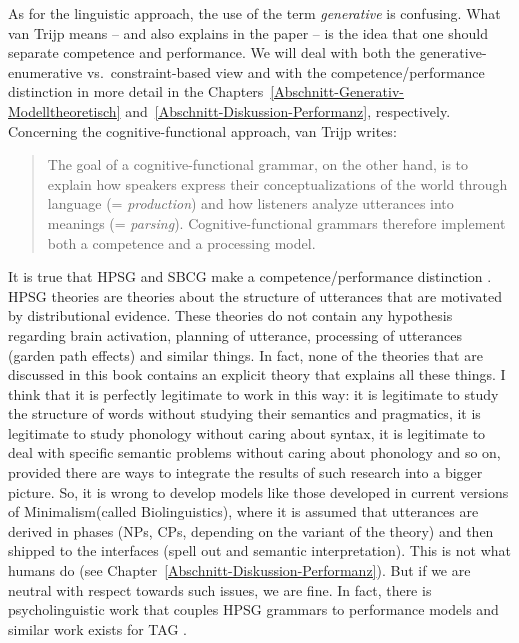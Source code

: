 \label{sec-performance-cxg}

As for the linguistic approach, the use of the term \emph{generative} is
confusing. What van Trijp means -- and also explains in the paper -- is the idea that one should
separate competence and performance. We will deal with both the generative-enumerative
vs.\ constraint-based view and with the competence/performance distinction in more detail in the
Chapters~\ref{Abschnitt-Generativ-Modelltheoretisch} and~\ref{Abschnitt-Diskussion-Performanz},
respectively. Concerning the cognitive-functional approach, van Trijp writes:
\begin{quote}
The goal of a cognitive-functional grammar, on the other hand, is to explain
how speakers express their conceptualizations of the world through language
(= \emph{production}) and how listeners analyze utterances into meanings (= \emph{parsing}).
Cognitive-functional grammars therefore implement both a competence and a
processing model. \citep[]{vanTrijp2013a}
\end{quote}
It is true that HPSG and SBCG make a competence/performance distinction \citep{SW2011a}. HPSG
theories are theories about the structure of utterances that are motivated by distributional
evidence. These theories do not contain any hypothesis regarding brain activation, planning of
utterance, processing of utterances (garden path effects) and similar things. In fact, none of the
theories that are discussed in this book contains an explicit theory that explains all these
things. I think that it is perfectly legitimate to work in this way: it is legitimate to study the
structure of words without studying their semantics and pragmatics, it is legitimate to study
phonology without caring about syntax, it is legitimate to deal with specific semantic problems
without caring about phonology and so on, provided there are ways to integrate the results of such
research into a bigger picture. So, it is wrong to develop models like those developed in current
versions of Minimalism\indexmp (called Biolinguistics), where it is assumed that utterances are derived in
phases (NPs, CPs, depending on the variant of the theory) and then shipped to the interfaces (spell
out and semantic interpretation). This is not what humans do (see
Chapter~\ref{Abschnitt-Diskussion-Performanz}). But if we are neutral with respect towards such
issues, we are fine. In fact, there is psycholinguistic work that couples HPSG grammars to
performance models \citep{Konieczny96a-u} and similar work exists for TAG \citep{SJ93a,DK2008a-u}. 

